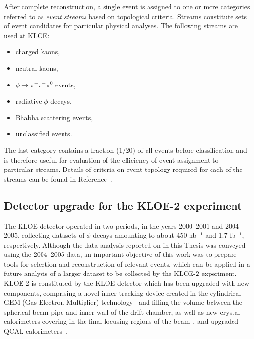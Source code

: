 After complete reconstruction, a single event is assigned to one or more categories referred to as \textit{event streams} based on topological criteria. Streams constitute sets of event candidates for particular physical analyses. The following streams are used at KLOE:
\begin{itemize}
\item charged kaons,
\item neutral kaons,
\item $\phi\to\pi^+\pi^-\pi^0$ events,
\item radiative $\phi$ decays,
\item Bhabha scattering events,
\item unclassified events.
\end{itemize}
The last category contains a fraction (1/20) of all events before classification and is therefore useful for evaluation of the efficiency of event assignment to particular streams. Details of criteria on event topology required for each of the streams can be found in Reference~\cite{memo_225}.  


\subsection{Detector upgrade for the KLOE-2 experiment}\label{sec:kloe2}
The KLOE detector operated in two periods, in the years 2000--2001 and 2004--2005, collecting datasets of $\phi$ decays amounting to about 450 nb$^{-1}$ and 1.7 fb$^{-1}$, respectively. Although the data analysis reported on in this Thesis was conveyed using the 2004--2005 data, an important objective of this work was to prepare tools for selection and reconstruction of relevant events, which can be applied in a future analysis of a larger dataset to be collected by the KLOE-2 experiment. KLOE-2 is constituted by the KLOE detector which has been upgraded with new components, comprising a novel inner tracking device created in the cylindrical-GEM (Gas Electron Multiplier) technology~\cite{kloe_inner_tracker} and filling the volume between the spherical beam pipe and inner wall of the drift chamber, as well as new crystal calorimeters covering in the final focusing regions of the beam~\cite{Cordelli:2013mka}, and upgraded QCAL calorimeters~\cite{Cordelli:2009xb}.

